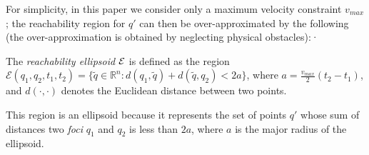 \documentclass[10pt,twocolumn,twoside]{IEEEtran}
\begin{document}
For simplicity, in this paper we consider only a maximum velocity constraint $v_{max}$; the reachability region for $q'$ can then be over-approximated by the following (the over-approximation is obtained by neglecting physical obstacles):·
\begin{definition}\label{def:Reachability}
	The \emph{reachability ellipsoid $\mathcal{E}$} is defined as the region $\mathcal{E}(q_1,q_2,t_{1},t_{2})=\{\tilde{q}\in\mathbb{R}^n: d(q_1,\tilde{q})+d(\tilde{q},q_2)<2a\}$, where $a=\frac{v_{max}}{2}(t_2-t_1)$, and $d(\cdot,\cdot)$ denotes the Euclidean distance between two points.
\end{definition}
This region is an ellipsoid because it represents the set of points $q'$ whose sum of distances two \emph{foci} $q_1$ and $q_2$ is less than $2a$, where $a$ is the major radius of the ellipsoid. 
 \begin{figure}
    \centering


\end{figure}
\end{document}
